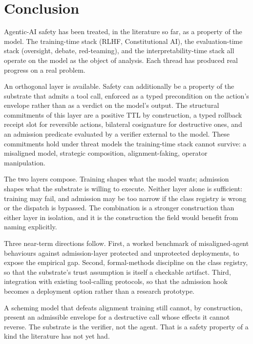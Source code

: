 \section{Conclusion}
\label{sec:conclusion}

Agentic-AI safety has been treated, in the literature so far, as a property of the model. The training-time stack (RLHF, Constitutional AI), the evaluation-time stack (oversight, debate, red-teaming), and the interpretability-time stack all operate on the model as the object of analysis. Each thread has produced real progress on a real problem.

An orthogonal layer is available. Safety can additionally be a property of the substrate that admits a tool call, enforced as a typed precondition on the action's envelope rather than as a verdict on the model's output. The structural commitments of this layer are a positive TTL by construction, a typed rollback receipt slot for reversible actions, bilateral cosignature for destructive ones, and an admission predicate evaluated by a verifier external to the model. These commitments hold under threat models the training-time stack cannot survive: a misaligned model, strategic composition, alignment-faking, operator manipulation.

The two layers compose. Training shapes what the model wants; admission shapes what the substrate is willing to execute. Neither layer alone is sufficient: training may fail, and admission may be too narrow if the class registry is wrong or the dispatch is bypassed. The combination is a stronger construction than either layer in isolation, and it is the construction the field would benefit from naming explicitly.

Three near-term directions follow. First, a worked benchmark of misaligned-agent behaviours against admission-layer protected and unprotected deployments, to expose the empirical gap. Second, formal-methods discipline on the class registry, so that the substrate's trust assumption is itself a checkable artifact. Third, integration with existing tool-calling protocols, so that the admission hook becomes a deployment option rather than a research prototype.

A scheming model that defeats alignment training still cannot, by construction, present an admissible envelope for a destructive call whose effects it cannot reverse. The substrate is the verifier, not the agent. That is a safety property of a kind the literature has not yet had.
